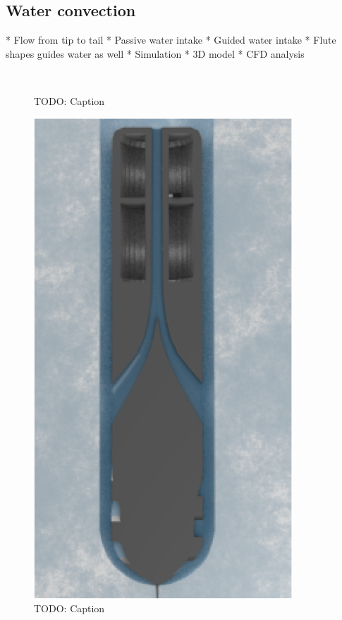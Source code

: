 \subsection{Water convection}

* Flow from tip to tail
* Passive water intake
	* Guided water intake
	* Flute shapes guides water as well
* Simulation
	* 3D model
	* CFD analysis

\begin{figure}[htb]
	\centering
	\\
	\caption{TODO: Caption}
	\label{fig:3d_model}
\end{figure}

\begin{figure}[htb]
	\centering
	\includegraphics[width=.5\textwidth]{figures/convection/water_transportation}
	\caption{TODO: Caption}
	\label{fig:water_transportation}
\end{figure}

